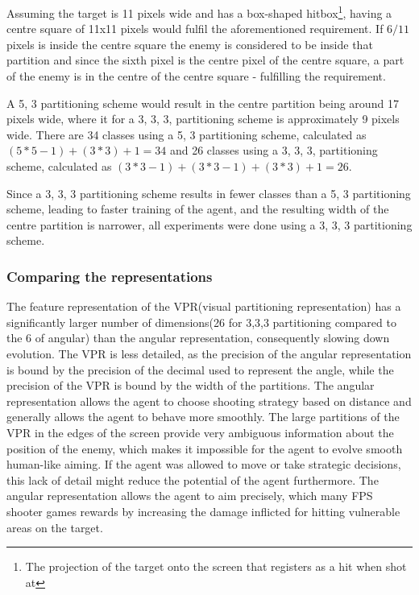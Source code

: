 Assuming the target is 11 pixels wide and has a box-shaped hitbox\footnote{The projection of the target onto the screen that registers as a hit when shot at}, having a centre square of 11x11 pixels would fulfil the aforementioned requirement. If $6/11$ pixels is inside the centre square the enemy is considered to be inside that partition and since the sixth pixel is the centre pixel of the centre square, a part of the enemy is in the centre of the centre square - fulfilling the requirement.

A 5, 3 partitioning scheme would result in the centre partition being around 17 pixels wide, where it for a 3, 3, 3, partitioning scheme is approximately 9 pixels wide. There are 34 classes using a 5, 3 partitioning scheme, calculated as $(5*5-1)+(3*3)+1=34$ and 26 classes using a 3, 3, 3, partitioning scheme, calculated as $(3*3-1)+(3*3-1)+(3*3)+1=26$.

Since a 3, 3, 3 partitioning scheme results in fewer classes than a 5, 3 partitioning scheme, leading to faster training of the agent, and the resulting width of the centre partition is narrower, all experiments were done using a 3, 3, 3 partitioning scheme.




\subsubsection{Comparing the representations}
The feature representation of the VPR(visual partitioning representation) has a significantly larger number of dimensions(26 for 3,3,3 partitioning compared to the 6 of angular) than the angular representation, consequently slowing down evolution. The VPR is less detailed, as the precision of the angular representation is bound by the precision of the decimal used to represent the angle, while the precision of the VPR is bound by the width of the partitions. The angular representation allows the agent to choose shooting strategy based on distance and generally allows the agent to behave more smoothly. The large partitions of the VPR in the edges of the screen provide very ambiguous information about the position of the enemy, which makes it impossible for the agent to evolve smooth human-like aiming. If the agent was allowed to move or take strategic decisions, this lack of detail might reduce the potential of the agent furthermore. The angular representation allows the agent to aim precisely, which many FPS shooter games rewards by increasing the damage inflicted for hitting vulnerable areas on the target.

